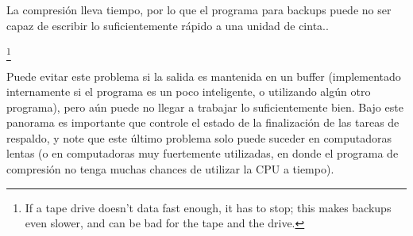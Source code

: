 ﻿\documentclass[12pt]{article}
\begin{document}
	

La compresión lleva tiempo, por lo que el programa para backups puede 
no ser capaz de escribir lo suficientemente rápido a una unidad de cinta..
	
		\footnote{If a tape drive doesn't data fast enough,
		it has to stop; this makes backups even slower, and can
		be bad for the tape and the drive.}
		

Puede evitar este problema si la
salida es mantenida en un buffer (implementado internamente si el programa es 
un poco inteligente, o utilizando algún otro programa), pero aún puede no llegar a 
trabajar lo suficientemente bien. Bajo este panorama es importante que controle
el estado de la finalización de las tareas de respaldo, y note que este último problema
solo puede suceder en computadoras lentas (o en computadoras muy fuertemente utilizadas,
en donde el programa de compresión no tenga muchas chances de utilizar la CPU a tiempo).
\end{document}

